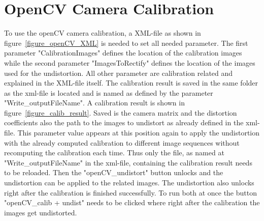 \section{OpenCV Camera Calibration}
%

%
To use the openCV camera calibration, a XML-file as shown in figure~\ref{figure_openCV_XML} is needed to set all needed parameter.
%
The first parameter "CalibrationImages" defines the location of the calibration images while the second parameter "ImagesToRectify" defines the location of the images used for the undistortion.
%
All other parameter are calibration related and explained in the XML-file itself.
%
The calibration result is saved in the same folder as the xml-file is located and is named as defined by the parameter "Write\_outputFileName".
%
A calibration result is shown in figure~\ref{figure_calib_result}.
%
Saved is the camera matrix and the distortion coefficients also the path to the images to undistort as already defined in the xml-file.
%
This parameter value appears at this position again to apply the undistortion with the already computed calibration to different image sequences without recomputing the calibration each time.
%
Thus only the file, as named at "Write\_outputFileName" in the xml-file, containing the calibration result needs to be reloaded.
%
Then the "openCV\_undistort" button unlocks and the undistortion can be applied to the related images.
%
The undistortion also unlocks right after the calibration is finished successfully.
%
To run both at once the button "openCV\_calib + undist" needs to be clicked where right after the calibration the images get undistorted.
%

%

%
